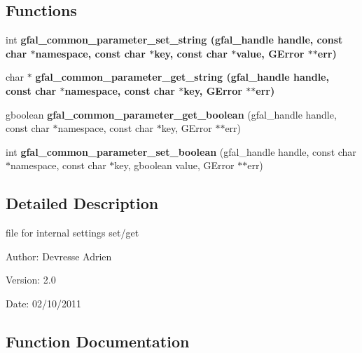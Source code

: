 \subsection*{Functions}
\begin{CompactItemize}
\item 
int \bf{gfal\_\-common\_\-parameter\_\-set\_\-string} (gfal\_\-handle handle, const char $\ast$namespace, const char $\ast$key, const char $\ast$value, GError $\ast$$\ast$err)
\item 
char $\ast$ \bf{gfal\_\-common\_\-parameter\_\-get\_\-string} (gfal\_\-handle handle, const char $\ast$namespace, const char $\ast$key, GError $\ast$$\ast$err)
\item 
gboolean \textbf{gfal\_\-common\_\-parameter\_\-get\_\-boolean} (gfal\_\-handle handle, const char $\ast$namespace, const char $\ast$key, GError $\ast$$\ast$err)\label{gfal__common__parameter_8c_b57c6f6aed12cfceb7ee631a0ef01b44}

\item 
int \textbf{gfal\_\-common\_\-parameter\_\-set\_\-boolean} (gfal\_\-handle handle, const char $\ast$namespace, const char $\ast$key, gboolean value, GError $\ast$$\ast$err)\label{gfal__common__parameter_8c_b1a9abb4de98df443fec2e491b4b6c54}

\end{CompactItemize}


\subsection{Detailed Description}
file for internal settings set/get 

\begin{Desc}
\item[Author:]Devresse Adrien \end{Desc}
\begin{Desc}
\item[Version:]2.0 \end{Desc}
\begin{Desc}
\item[Date:]02/10/2011 \end{Desc}


\subsection{Function Documentation}
